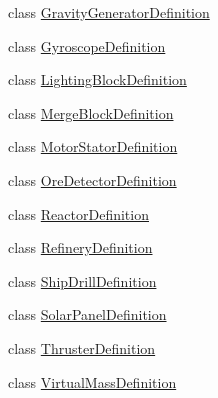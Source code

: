 \begin{DoxyCompactItemize}
\item 
class \hyperlink{class_s_e_mod_a_p_i_1_1_a_p_i_1_1_definitions_1_1_cube_blocks_1_1_gravity_generator_definition}{Gravity\+Generator\+Definition}
\item 
class \hyperlink{class_s_e_mod_a_p_i_1_1_a_p_i_1_1_definitions_1_1_cube_blocks_1_1_gyroscope_definition}{Gyroscope\+Definition}
\item 
class \hyperlink{class_s_e_mod_a_p_i_1_1_a_p_i_1_1_definitions_1_1_cube_blocks_1_1_lighting_block_definition}{Lighting\+Block\+Definition}
\item 
class \hyperlink{class_s_e_mod_a_p_i_1_1_a_p_i_1_1_definitions_1_1_cube_blocks_1_1_merge_block_definition}{Merge\+Block\+Definition}
\item 
class \hyperlink{class_s_e_mod_a_p_i_1_1_a_p_i_1_1_definitions_1_1_cube_blocks_1_1_motor_stator_definition}{Motor\+Stator\+Definition}
\item 
class \hyperlink{class_s_e_mod_a_p_i_1_1_a_p_i_1_1_definitions_1_1_cube_blocks_1_1_ore_detector_definition}{Ore\+Detector\+Definition}
\item 
class \hyperlink{class_s_e_mod_a_p_i_1_1_a_p_i_1_1_definitions_1_1_cube_blocks_1_1_reactor_definition}{Reactor\+Definition}
\item 
class \hyperlink{class_s_e_mod_a_p_i_1_1_a_p_i_1_1_definitions_1_1_cube_blocks_1_1_refinery_definition}{Refinery\+Definition}
\item 
class \hyperlink{class_s_e_mod_a_p_i_1_1_a_p_i_1_1_definitions_1_1_cube_blocks_1_1_ship_drill_definition}{Ship\+Drill\+Definition}
\item 
class \hyperlink{class_s_e_mod_a_p_i_1_1_a_p_i_1_1_definitions_1_1_cube_blocks_1_1_solar_panel_definition}{Solar\+Panel\+Definition}
\item 
class \hyperlink{class_s_e_mod_a_p_i_1_1_a_p_i_1_1_definitions_1_1_cube_blocks_1_1_thruster_definition}{Thruster\+Definition}
\item 
class \hyperlink{class_s_e_mod_a_p_i_1_1_a_p_i_1_1_definitions_1_1_cube_blocks_1_1_virtual_mass_definition}{Virtual\+Mass\+Definition}
\end{DoxyCompactItemize}

